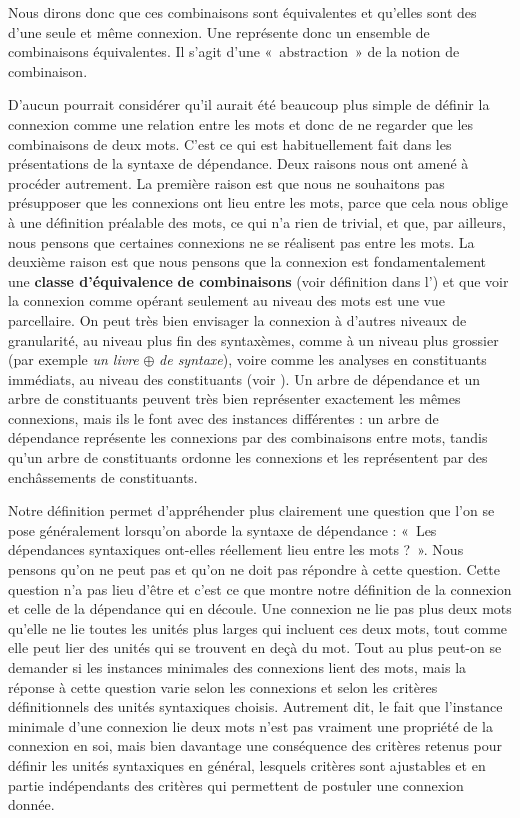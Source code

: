 \begin{styleLivreImportant}
Nous dirons donc que ces combinaisons sont équivalentes et qu’elles sont des  d’une seule et même connexion. Une  représente donc un ensemble de combinaisons équivalentes. Il s’agit d’une «~abstraction~» de la notion de combinaison.
\end{styleLivreImportant}

D’aucun pourrait considérer qu’il aurait été beaucoup plus simple de définir la connexion comme une relation entre les mots et donc de ne regarder que les combinaisons de deux mots. C’est ce qui est habituellement fait dans les présentations de la syntaxe de dépendance. Deux raisons nous ont amené à procéder autrement. La première raison est que nous ne souhaitons pas présupposer que les connexions ont lieu entre les mots, parce que cela nous oblige à une définition préalable des mots, ce qui n’a rien de trivial, et que, par ailleurs, nous pensons que certaines connexions ne se réalisent pas entre les mots. La deuxième raison est que nous pensons que la connexion est fondamentalement une \textbf{classe d’équivalence} \textbf{de combinaisons} (voir définition dans l’) et que voir la connexion comme opérant seulement au niveau des mots est une vue parcellaire. On peut très bien envisager la connexion à d’autres niveaux de granularité, au niveau plus fin des syntaxèmes, comme à un niveau plus grossier (par exemple \textit{un livre} ${\oplus}$ \textit{de syntaxe}), voire comme les analyses en constituants immédiats, au niveau des constituants (voir ). Un arbre de dépendance et un arbre de constituants peuvent très bien représenter exactement les mêmes connexions, mais ils le font avec des instances différentes : un arbre de dépendance représente les connexions par des combinaisons entre mots, tandis qu’un arbre de constituants ordonne les connexions et les représentent par des enchâssements de constituants.

Notre définition permet d’appréhender plus clairement une question que l’on se pose généralement lorsqu’on aborde la syntaxe de dépendance : «~Les dépendances syntaxiques ont-elles réellement lieu entre les mots ?~». Nous pensons qu’on ne peut pas et qu’on ne doit pas répondre à cette question. Cette question n’a pas lieu d’être et c’est ce que montre notre définition de la connexion et celle de la dépendance qui en découle. Une connexion ne lie pas plus deux mots qu’elle ne lie toutes les unités plus larges qui incluent ces deux mots, tout comme elle peut lier des unités qui se trouvent en deçà du mot. Tout au plus peut-on se demander si les instances minimales des connexions lient des mots, mais la réponse à cette question varie selon les connexions et selon les critères définitionnels des unités syntaxiques choisis. Autrement dit, le fait que l’instance minimale d’une connexion lie deux mots n’est pas vraiment une propriété de la connexion en soi, mais bien davantage une conséquence des critères retenus pour définir les unités syntaxiques en général, lesquels critères sont ajustables et en partie indépendants des critères qui permettent de postuler une connexion donnée.


